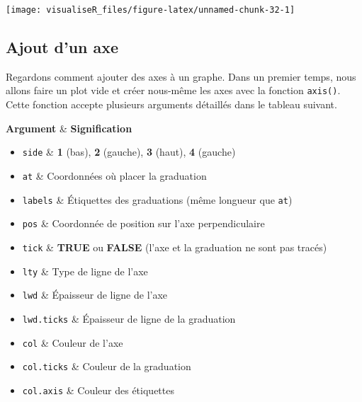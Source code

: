 \documentclass[]{article}
\providecommand{\tightlist}{%
  \setlength{\itemsep}{0pt}\setlength{\parskip}{0pt}}
\begin{document}
\begin{center}\texttt{[image: visualiseR\_files/figure-latex/unnamed-chunk-32-1]} \end{center}

\hypertarget{ajout-dun-axe}{%
\subsection{Ajout d'un axe}\label{ajout-dun-axe}}

Regardons comment ajouter des axes à un graphe. Dans un premier temps, nous allons faire un plot vide et créer nous-même les axes avec la fonction \texttt{axis()}. Cette fonction accepte plusieurs arguments détaillés dans le tableau suivant.

\textbf{Argument} \& \textbf{Signification}

\begin{itemize}
\tightlist
\item
  \texttt{side} \& \textbf{1} (bas), \textbf{2} (gauche), \textbf{3} (haut), \textbf{4} (gauche)
\item
  \texttt{at} \& Coordonnées où placer la graduation
\item
  \texttt{labels} \& Étiquettes des graduations (même longueur que \texttt{at})
\item
  \texttt{pos} \& Coordonnée de position sur l'axe perpendiculaire
\item
  \texttt{tick} \& \textbf{TRUE} ou \textbf{FALSE} (l'axe et la graduation ne sont pas tracés)
\item
  \texttt{lty} \& Type de ligne de l'axe
\item
  \texttt{lwd} \& Épaisseur de ligne de l'axe
\item
  \texttt{lwd.ticks} \& Épaisseur de ligne de la graduation
\item
  \texttt{col} \& Couleur de l'axe
\item
  \texttt{col.ticks} \& Couleur de la graduation
\item
  \texttt{col.axis} \& Couleur des étiquettes
\end{itemize}
\end{document}
